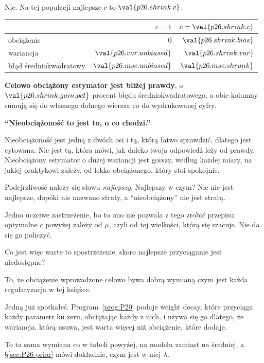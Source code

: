 \begin{fr}
\begin{ansblock}
Nie. Na tej populacji najlepsze $c$ to $\val{p26.shrink.c}$.
\end{ansblock}

\begin{center}
\begin{tabular}{lrr}
\toprule
& $c = 1$ & $c = \val{p26.shrink.c}$ \\
\midrule
obciążenie & $0$ & $\val{p26.shrink.bias}$ \\
wariancja & $\val{p26.var.unbiased}$ & $\val{p26.shrink.var}$ \\
błąd średniokwadratowy & $\val{p26.mse.unbiased}$ & $\val{p26.mse.shrunk}$ \\
\bottomrule
\end{tabular}
\end{center}

\textbf{Celowo obciążony estymator jest bliżej prawdy}, o
$\val{p26.shrink.gain.pct}$ procent błędu średniokwadratowego, a obie kolumny
sumują się do własnego dolnego wiersza co do wydrukowanej cyfry.
\end{fr}

\begin{fr}
\begin{trapbox}
\textbf{\enquote{Nieobciążoność to jest to, o co chodzi.}}

Nieobciążoność jest jedną z dwóch osi i tą, którą łatwo sprawdzić, dlatego
jest cytowana. Nie jest tą, która mówi, jak daleko twoja odpowiedź leży od
prawdy. Nieobciążony estymator o dużej wariancji jest gorszy, według każdej
miary, na jakiej praktykowi zależy, od lekko obciążonego, który stoi
spokojnie.

Podejrzliwość należy się słowu \emph{najlepszy}. Najlepszy w czym? Nic nie
jest najlepsze, dopóki nie nazwano straty, a \enquote{nieobciążony} nie jest
stratą.
\end{trapbox}

Jedno uczciwe zastrzeżenie, bo to ono nie pozwala z tego zrobić przepisu:
optymalne $c$ powyżej zależy od $\mu$, czyli od tej wielkości, którą się
szacuje. Nie da się go policzyć.

Co jest więc warte to spostrzeżenie, skoro najlepsze przyciąganie jest
niedostępne?
\dotline
\nextframe
\end{fr}

\begin{fr}
\begin{ansblock}
To, że obciążenie wprowadzone celowo bywa dobrą wymianą \dash{} czym jest
każda regularyzacja w tej książce.
\end{ansblock}

Jedną już spotkałeś. Program~\ref{prog:P20} podaje weight decay, które
przyciąga każdy parametr ku zeru, obciążając każdy z nich, i używa się go
dlatego, że wariancja, którą usuwa, jest warta więcej niż obciążenie, które
dodaje.

To ta sama wymiana co w tabeli powyżej, na modelu zamiast na średniej, a
\S\ref{sec:P26-prior} mówi dokładnie, czym jest w niej $\lambda$.
\end{fr}


